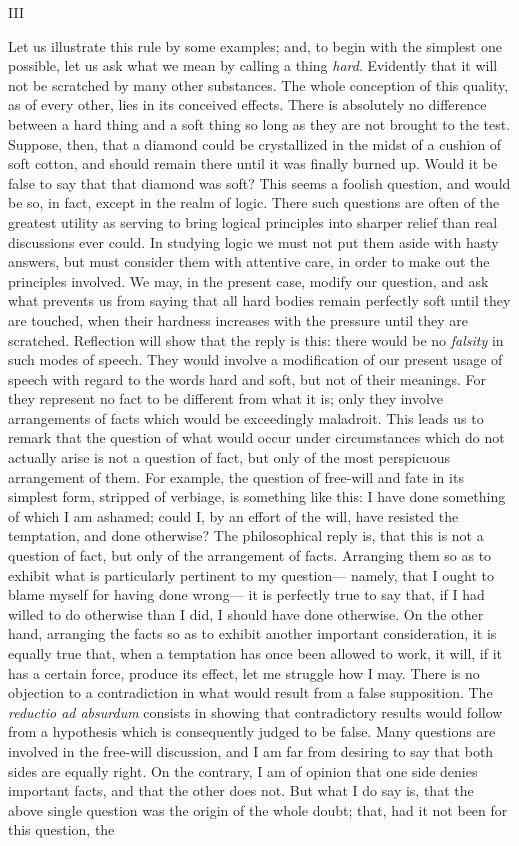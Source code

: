\documentclass[]{article}
\newcommand*{\itemsection}[1]{\bigskip\centerline{#1}\nopagebreak}
\begin{document}
\itemsection{III}

Let us illustrate this rule by some examples; and, to begin with the simplest one possible, let us ask what we mean by calling a thing \emph{hard}. Evidently that it will not be scratched by many other substances. The whole conception of this quality, as of every other, lies in its conceived effects. There is absolutely no difference between a hard thing and a soft thing so long as they are not brought to the test. Suppose, then, that a diamond could be crystallized in the midst of a cushion of soft cotton, and should remain there until it was finally burned up. Would it be false to say that that diamond was soft? This seems a foolish question, and would be so, in fact, except in the realm of logic. There such questions are often of the greatest utility as serving to bring logical principles into sharper relief than real discussions ever could. In studying logic we must not put them aside with hasty answers, but must consider them with attentive care, in order  to make out the principles involved. We may, in the present case, modify our question, and ask what prevents us from saying that all hard bodies remain perfectly soft until they are touched, when their hardness increases with the pressure until they are scratched. Reflection will show that the reply is this: there would be no \emph{falsity} in such modes of speech. They would involve a modification of our present usage of speech with regard to the words hard and soft, but not of their meanings. For they represent no fact to be different from what it is; only they involve arrangements of facts which would be exceedingly maladroit. This leads us to remark that the question of what would occur under circumstances which do not actually arise is not a question of fact, but only of the most perspicuous arrangement of them. For example, the question of free-will and fate in its simplest form, stripped of verbiage, is something like this: I have done something of which I am ashamed; could I, by an effort of the will, have resisted the temptation, and done otherwise? The philosophical reply is, that this is not a question of fact, but only of the arrangement of facts. Arranging them so as to exhibit what is particularly pertinent to my question--- namely, that I ought to blame myself for having done wrong--- it is perfectly true to say that, if I had willed to do otherwise than I did, I should have done otherwise. On the other hand, arranging the facts so as to exhibit another important consideration, it is equally true that, when a temptation has once been allowed to work, it will, if it has a certain force, produce its effect, let me struggle how I may. There is no objection to a contradiction in what would result from a false supposition. The \emph{reductio ad absurdum} consists in showing that contradictory results would follow from a hypothesis which is consequently judged to be false. Many questions are involved in the free-will discussion, and I am far from desiring to say that both sides are equally right. On the contrary, I am of opinion that one side denies important facts, and that the other does not. But what I do say is, that the above single question was the origin of the whole doubt; that, had it not been for this question, the 
\end{document}

